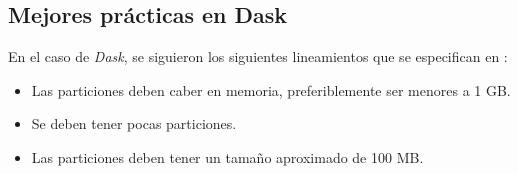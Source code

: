 \subsection{Mejores prácticas en Dask}

En el caso de \textit{Dask}, se siguieron los siguientes lineamientos que se especifican en \cite{daskbestpractices}:
\begin{itemize}
	\item Las particiones deben caber en memoria, preferiblemente ser menores a 1 GB.
	\item Se deben tener pocas particiones.
	\item Las particiones deben tener un tamaño aproximado de 100 MB.
\end{itemize}

